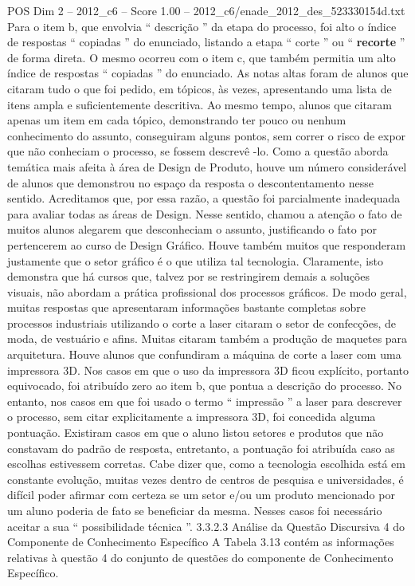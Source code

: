 \begin{textsample}{POS Dim 2 – 2012\_c6 – Score 1.00 – 2012\_c6/enade\_2012\_des\_523330154d.txt}
Para o item b, que envolvia “ descrição ” da etapa do processo, foi alto o índice de respostas “ copiadas ” do enunciado, listando a etapa “ corte ” ou “ \textbf{recorte} ” de forma direta.
O mesmo ocorreu com o item c, que também permitia um alto índice de respostas “ copiadas ” do enunciado.
As notas altas foram de alunos que citaram tudo o que foi pedido, em tópicos, às vezes, apresentando uma lista de itens ampla e suficientemente descritiva.
Ao mesmo tempo, alunos que citaram apenas um item em cada tópico, demonstrando ter pouco ou nenhum conhecimento do assunto, conseguiram alguns pontos, sem correr o risco de expor que não conheciam o processo, se fossem descrevê -lo.
Como a questão aborda temática mais afeita à área de Design de Produto, houve um número considerável de alunos que demonstrou no espaço da resposta o descontentamento nesse sentido.
Acreditamos que, por essa razão, a questão foi parcialmente inadequada para avaliar todas as áreas de Design.
Nesse sentido, chamou a atenção o fato de muitos alunos alegarem que desconheciam o assunto, justificando o fato por pertencerem ao curso de Design Gráfico.
Houve também muitos que responderam justamente que o setor gráfico é o que utiliza tal tecnologia.
Claramente, isto demonstra que há cursos que, talvez por se restringirem demais a soluções visuais, não abordam a prática profissional dos processos gráficos.
De modo geral, muitas respostas que apresentaram informações bastante completas sobre processos industriais utilizando o corte a laser citaram o setor de confecções, de moda, de vestuário e afins.
Muitas citaram também a produção de maquetes para arquitetura.
Houve alunos que confundiram a máquina de corte a laser com uma impressora 3D.
Nos casos em que o uso da impressora 3D ficou explícito, portanto equivocado, foi atribuído zero ao item b, que pontua a descrição do processo.
No entanto, nos casos em que foi usado o termo “ impressão ” a laser para descrever o processo, sem citar explicitamente a impressora 3D, foi concedida alguma pontuação.
Existiram casos em que o aluno listou setores e produtos que não constavam do padrão de resposta, entretanto, a pontuação foi atribuída caso as escolhas estivessem corretas.
Cabe dizer que, como a tecnologia escolhida está em constante evolução, muitas vezes dentro de centros de pesquisa e universidades, é difícil poder afirmar com certeza se um setor e/ou um produto mencionado por um aluno poderia de fato se beneficiar da mesma.
Nesses casos foi necessário aceitar a sua “ possibilidade técnica ”. 3.3.2.3 Análise da Questão Discursiva 4 do Componente de Conhecimento Específico A Tabela 3.13 contém as informações relativas à questão 4 do conjunto de questões do componente de Conhecimento Específico.

\end{textsample}
